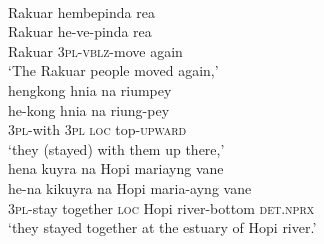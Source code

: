 \ea 
{}\\
\ea
\glll Rakuar hembepinda rea \\
Rakuar he-ve-pinda rea \\
Rakuar \textsc{3}\textsc{pl}-\textsc{vblz}-move again \\
\glft `The Rakuar people moved again,' \\ 
\ex \label{wooi-kong}
\glll hengkong hnia na riumpey \\
he-kong hnia na riung-pey \\
\textsc{3}\textsc{pl}-with \textsc{3}\textsc{pl} \textsc{loc} top-\textsc{upward} \\
\glft `they (stayed) with them up there,' \\ 
\ex
\glll hena kuyra na Hopi mariayng vane \\ 
he-na kikuyra na Hopi maria-ayng vane \\
\textsc{3}\textsc{pl}-stay together \textsc{loc} Hopi river-bottom \textsc{det}.\textsc{nprx} \\
\glft `they stayed together at the estuary of Hopi river.'\\ 
\z
\z

